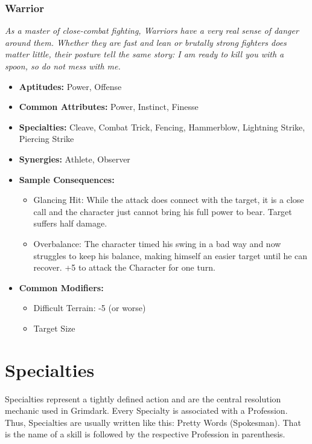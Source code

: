 \subsubsection{Warrior}\label{Warrior}
\textit{As a master of close-combat fighting, Warriors have a very real sense of danger around them.
Whether they are fast and lean or brutally strong fighters does matter little, their posture tell the same story: 
I am ready to kill you with a spoon, so do not mess with me.}
\begin{itemize}
	\item \textbf{Aptitudes:} Power, Offense
	\item \textbf{Common Attributes:} Power, Instinct, Finesse 
	\item \textbf{Specialties:} Cleave, Combat Trick, Fencing, Hammerblow, Lightning Strike, Piercing Strike
	\item \textbf{Synergies:} Athlete, Observer
	\item \textbf{Sample Consequences:} 
	\begin{itemize}
		\item Glancing Hit: While the attack does connect with the target, it is a close call and the character just cannot bring his full power to bear. Target suffers half damage.
		\item Overbalance: The character timed his swing in a bad way and now struggles to keep his balance, making himself an easier target until he can recover. +5 to attack the Character for one turn.
	\end{itemize}
	\item \textbf{Common Modifiers:}
	\begin{itemize}
		\item Difficult Terrain: -5 (or worse)
		\item Target Size
	\end{itemize}
\end{itemize}


\section{Specialties}%
\label{sec:Specialties}
Specialties represent a tightly defined action and are the central resolution mechanic used in Grimdark. 
Every Specialty is associated with a Profession.
Thus, Specialties are usually written like this: Pretty Words (Spokesman).
That is the name of a skill is followed by the respective Profession in parenthesis.

